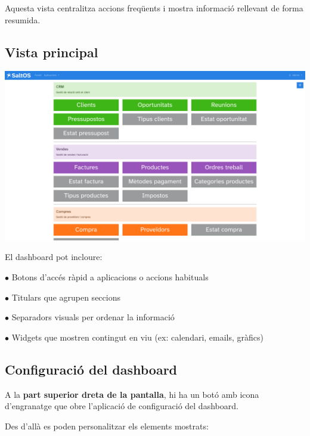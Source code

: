 \documentclass[a4paper]{article}
\begin{document}
Aquesta vista centralitza accions freqüents i mostra informació rellevant de forma resumida.

\hypertarget{toc83}{}
\subsection{Vista principal}

\begin{center}\includegraphics[width=1\textwidth]{../ujest/snaps/test-screenshots-js-screenshots-dashboard-dashboard-ca-es-1-snap.png}\end{center}

El dashboard pot incloure:

\begin{compactitem}
\item[\color{myblue}$\bullet$] Botons d'accés ràpid a aplicacions o accions habituals
\item[\color{myblue}$\bullet$] Titulars que agrupen seccions
\item[\color{myblue}$\bullet$] Separadors visuals per ordenar la informació
\item[\color{myblue}$\bullet$] Widgets que mostren contingut en viu (ex: calendari, emails, gràfics)
\end{compactitem}

\hypertarget{toc84}{}
\subsection{Configuració del dashboard}

A la \textbf{part superior dreta de la pantalla}, hi ha un botó amb icona d'engranatge que obre l'aplicació de configuració del dashboard.

Des d'allà es poden personalitzar els elements mostrats:
\end{document}
